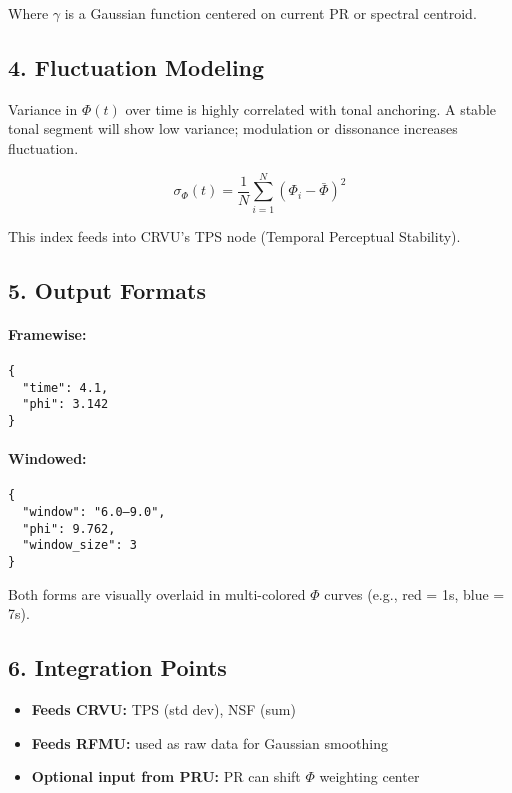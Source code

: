 \documentclass{article}
\begin{document}
Where $\gamma$ is a Gaussian function centered on current PR or spectral centroid.

\subsection*{4. Fluctuation Modeling}

Variance in $\Phi(t)$ over time is highly correlated with tonal anchoring. A stable tonal segment will show low variance; modulation or dissonance increases fluctuation.

\[
\sigma_\Phi(t) = \frac{1}{N} \sum_{i=1}^N \left( \Phi_i - \bar{\Phi} \right)^2
\]

This index feeds into CRVU's TPS node (Temporal Perceptual Stability).

\subsection*{5. Output Formats}

\paragraph{Framewise:}
\begin{verbatim}
{
  "time": 4.1,
  "phi": 3.142
}
\end{verbatim}

\paragraph{Windowed:}
\begin{verbatim}
{
  "window": "6.0–9.0",
  "phi": 9.762,
  "window_size": 3
}
\end{verbatim}

Both forms are visually overlaid in multi-colored $\Phi$ curves (e.g., red = 1s, blue = 7s).

\subsection*{6. Integration Points}

\begin{itemize}
    \item \textbf{Feeds CRVU:} TPS (std dev), NSF (sum)
    \item \textbf{Feeds RFMU:} used as raw data for Gaussian smoothing
    \item \textbf{Optional input from PRU:} PR can shift $\Phi$ weighting center
\end{itemize}
\end{document}
